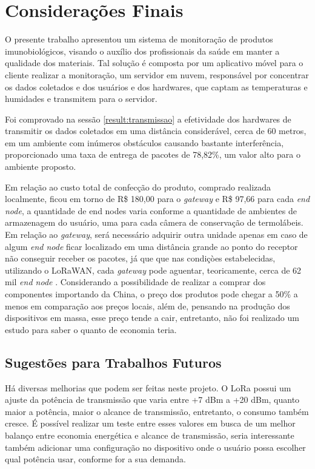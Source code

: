 \chapter{Considerações Finais}
\label{cap:conclusao}

O presente trabalho apresentou um sistema de monitoração de produtos imunobiológicos, visando o auxílio dos profissionais da saúde em manter a qualidade dos materiais. Tal solução é composta por um aplicativo móvel para o cliente realizar a monitoração, um servidor em nuvem, responsável por concentrar os dados coletados e dos usuários e dos hardwares, que captam as temperaturas e humidades e transmitem para o servidor.

Foi comprovado na sessão \ref{result:transmissao} a efetividade dos hardwares de transmitir os dados coletados em uma distância considerável, cerca de 60 metros, em um ambiente com inúmeros obstáculos causando bastante interferência, proporcionado uma taxa de entrega de pacotes de 78,82\%, um valor alto para o ambiente proposto.
 
Em relação ao custo total de confecção do produto, comprado realizada localmente, ficou  em torno de R\$ 180,00 para o \textit{gateway} e R\$ 97,66 para cada \textit{end node}, a quantidade de end nodes varia conforme a quantidade de ambientes de armazenagem do usuário, uma para cada câmera de conservação de termolábeis. Em relação ao \textit{gateway}, será necessário adquirir outra unidade apenas em caso de algum \textit{end node} ficar localizado em uma distância grande ao ponto do receptor não conseguir receber os pacotes, já que que nas condiçòes estabelecidas, utilizando o LoRaWAN, cada \textit{gateway} pode aguentar, teoricamente, cerca de 62 mil \textit{end node} \cite{lora2021specification}. Considerando a possibilidade de realizar a comprar dos componentes importando da China, o preço dos produtos pode chegar a 50\% a menos em comparação aos preços locais, além de, pensando na produção dos dispositivos em massa, esse preço tende a cair, entretanto, não foi realizado um estudo para saber o quanto de economia teria.


\section{Sugestões para Trabalhos Futuros}
\label{conclusao:futuros}
Há diversas melhorias que podem ser feitas neste projeto. O LoRa possui um ajuste da potência de transmissão que varia entre +7 dBm a +20 dBm, quanto maior a potência, maior o alcance de transmissão, entretanto, o consumo também cresce. É possível realizar um teste entre esses valores em busca de um melhor balanço entre economia energética e alcance de transmissão, seria interessante também adicionar uma configuração no dispositivo onde o usuário possa escolher qual potência usar, conforme for a sua demanda.

